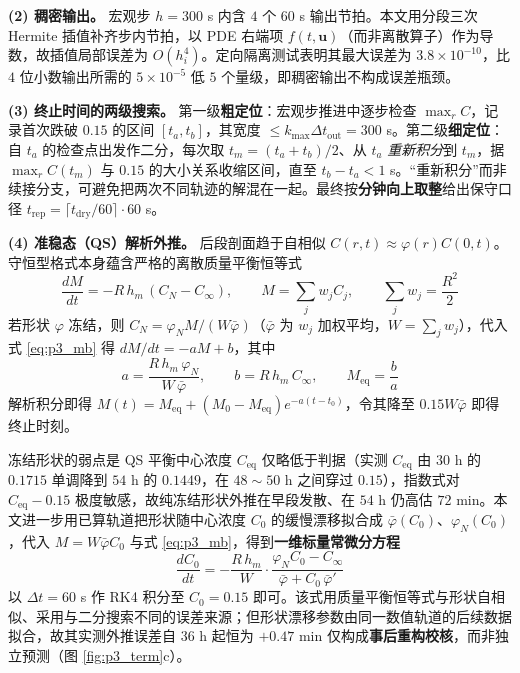 \textbf{(2) 稠密输出。} 宏观步 $h=300$ s 内含 $4$ 个 $60$ s 输出节拍。本文用分段三次 Hermite 插值补齐步内节拍，以 PDE 右端项 $f(t,\mathbf u)$（而非离散算子）作为导数，故插值局部误差为 $O(h_i^4)$。定向隔离测试表明其最大误差为 $3.8\times10^{-10}$，比 $4$ 位小数输出所需的 $5\times10^{-5}$ 低 $5$ 个量级，即稠密输出不构成误差瓶颈。

\textbf{(3) 终止时间的两级搜索。} 第一级\textbf{粗定位}：宏观步推进中逐步检查 $\max_rC$，记录首次跌破 $0.15$ 的区间 $[t_a,t_b]$，其宽度 $\le k_{\max}\Delta t_{\text{out}}=300$ s。第二级\textbf{细定位}：自 $t_a$ 的检查点出发作二分，每次取 $t_m=(t_a+t_b)/2$、从 $t_a$ \emph{重新积分}到 $t_m$，据 $\max_rC(t_m)$ 与 $0.15$ 的大小关系收缩区间，直至 $t_b-t_a<1$ s。“重新积分”而非续接分支，可避免把两次不同轨迹的解混在一起。最终按\textbf{分钟向上取整}给出保守口径 $t_{\text{rep}}=\lceil t_{\text{dry}}/60\rceil\cdot60$ s。

\textbf{(4) 准稳态（QS）解析外推。} 后段剖面趋于自相似 $C(r,t)\approx\varphi(r)C(0,t)$。守恒型格式本身蕴含严格的离散质量平衡恒等式
\begin{equation}
  \frac{dM}{dt}=-R\,h_m\,(C_N-C_\infty),\qquad M=\sum_j w_jC_j,\qquad \sum_j w_j=\frac{R^2}{2}
  \label{eq:p3_mb}
\end{equation}
若形状 $\varphi$ 冻结，则 $C_N=\varphi_NM/(W\bar\varphi)$（$\bar\varphi$ 为 $w_j$ 加权平均，$W=\sum_jw_j$），代入式 \eqref{eq:p3_mb} 得 $dM/dt=-aM+b$，其中
\begin{equation}
  a=\frac{R\,h_m\,\varphi_N}{W\,\bar\varphi},\qquad b=R\,h_m\,C_\infty,\qquad M_{\text{eq}}=\frac{b}{a}
  \label{eq:p3_qs0}
\end{equation}
解析积分即得 $M(t)=M_{\text{eq}}+(M_0-M_{\text{eq}})e^{-a(t-t_0)}$，令其降至 $0.15W\bar\varphi$ 即得终止时刻。

冻结形状的弱点是 QS 平衡中心浓度 $C_{\text{eq}}$ 仅略低于判据（实测 $C_{\text{eq}}$ 由 $30$ h 的 $0.1715$ 单调降到 $54$ h 的 $0.1449$，在 $48\sim50$ h 之间穿过 $0.15$），指数式对 $C_{\text{eq}}-0.15$ 极度敏感，故纯冻结形状外推在早段发散、在 $54$ h 仍高估 $72$ min。本文进一步用已算轨道把形状随中心浓度 $C_0$ 的缓慢漂移拟合成 $\bar\varphi(C_0)$、$\varphi_N(C_0)$，代入 $M=W\bar\varphi C_0$ 与式 \eqref{eq:p3_mb}，得到\textbf{一维标量常微分方程}
\begin{equation}
  \frac{dC_0}{dt}=-\frac{R\,h_m}{W}\cdot\frac{\varphi_NC_0-C_\infty}{\bar\varphi+C_0\,\bar\varphi'}
  \label{eq:p3_qs1}
\end{equation}
以 $\Delta t=60$ s 作 RK4 积分至 $C_0=0.15$ 即可。该式用质量平衡恒等式与形状自相似、采用与二分搜索不同的误差来源；但形状漂移参数由同一数值轨道的后续数据拟合，故其实测外推误差自 $36$ h 起恒为 $+0.47$ min 仅构成\textbf{事后重构校核}，而非独立预测（图 \ref{fig:p3_term}c）。

